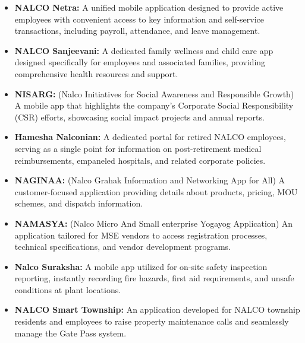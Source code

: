 \begin{itemize}
    \item \textbf{NALCO Netra:} A unified mobile application designed to provide active employees with convenient access to key information and self-service transactions, including payroll, attendance, and leave management.
    
    \item \textbf{NALCO Sanjeevani:} A dedicated family wellness and child care app designed specifically for employees and associated families, providing comprehensive health resources and support.
    
    \item \textbf{NISARG:} (Nalco Initiatives for Social Awareness and Responsible Growth) A mobile app that highlights the company's Corporate Social Responsibility (CSR) efforts, showcasing social impact projects and annual reports.
    
    \item \textbf{Hamesha Nalconian:} A dedicated portal for retired NALCO employees, serving as a single point for information on post-retirement medical reimbursements, empaneled hospitals, and related corporate policies.
    
    \item \textbf{NAGINAA:} (Nalco Grahak Information and Networking App for All) A customer-focused application providing details about products, pricing, MOU schemes, and dispatch information.
    
    \item \textbf{NAMASYA:} (Nalco Micro And Small enterprise Yogayog Application) An application tailored for MSE vendors to access registration processes, technical specifications, and vendor development programs.
    
    \item \textbf{Nalco Suraksha:} A mobile app utilized for on-site safety inspection reporting, instantly recording fire hazards, first aid requirements, and unsafe conditions at plant locations.
    
    \item \textbf{NALCO Smart Township:} An application developed for NALCO township residents and employees to raise property maintenance calls and seamlessly manage the Gate Pass system.
\end{itemize}